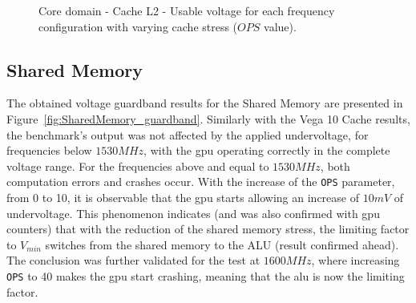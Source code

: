 \begin{figure}[!htb]
    \centering
    \begin{subfigmatrix}{2}
      \label{fig:CacheL2_guardband}
    \end{subfigmatrix}
    \caption{Core domain - Cache L2 - Usable voltage for each frequency configuration with varying cache stress ($OPS$ value).}
\end{figure}


\subsection{Shared Memory}

\label{sec:sm_guardband}

The obtained voltage guardband results for the Shared Memory are presented in Figure~\ref{fig:SharedMemory_guardband}. Similarly with the Vega 10 Cache results, the benchmark's output was not affected by the applied undervoltage, for frequencies below $1530MHz$, with the \acrshort{gpu} operating correctly in the complete voltage range. For the frequencies above and equal to $1530MHz$, both computation errors and crashes occur. With the increase of the \texttt{OPS} parameter, from 0 to 10, it is observable that the \acrshort{gpu} starts allowing an increase of $10mV$ of undervoltage. This phenomenon indicates (and was also confirmed with \acrshort{gpu} counters) that with the reduction of the shared memory stress, the limiting factor to $V_{min}$ switches from the shared memory to the ALU (result confirmed ahead). The conclusion was further validated for the test at $1600MHz$, where increasing  \texttt{OPS} to 40 makes the \acrshort{gpu} start  crashing, meaning that the \acrshort{alu} is now the limiting factor.

